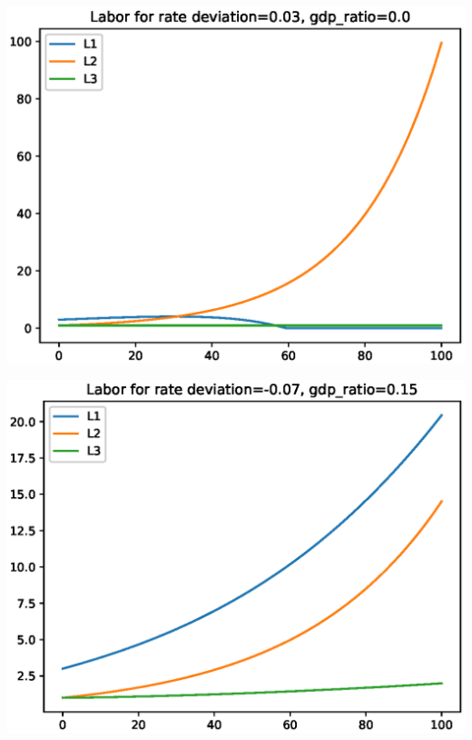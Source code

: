 \documentclass[12pt]{article}
\theoremstyle{definition}
\begin{document}
\begin{minipage}{\linewidth}
\begin{framed}
\begin{minipage}[t]{.48\textwidth}
\includegraphics[width=1\textwidth]{images/econ_1_run_2_labor}
\end{minipage}\hfill
\begin{minipage}[t]{.48\textwidth}
\centering
\includegraphics[width=1\textwidth]{images/econ_1_run_3_labor}
\end{minipage} \hfill
\begin{minipage}[t]{.48\textwidth}
\centering

\end{minipage}
\end{framed}
\end{minipage}
\end{document}
